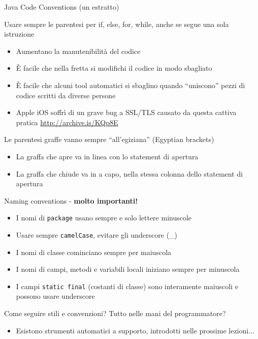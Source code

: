 \documentclass[xcolor=dvipsnames,presentation]{beamer}
\begin{document}
\begin{frame}[allowframebreaks]{Java Code Conventions (un estratto)}
	\begin{block}{Usare sempre le parentesi per if, else, for, while, anche se segue una sola istruzione}
		\begin{itemize}
			\item Aumentano la manutenibilità del codice
			\item È facile che nella fretta si modifichi il codice in modo sbagliato
			\item È facile che alcuni tool automatici si sbaglino quando ``uniscono'' pezzi di codice scritti da diverse persone
			\item Apple iOS soffrì di un grave bug a SSL/TLS causato da questa cattiva pratica \url{http://archive.is/KQp8E}
		\end{itemize}
	\end{block}
	\begin{block}{Le parentesi graffe vanno sempre ``all'egiziana'' (Egyptian brackets)}
		\begin{itemize}
			\item La graffa che apre va in linea con lo statement di apertura
			\item La graffa che chiude va in a capo, nella stessa colonna dello statement di apertura
		\end{itemize}
	\end{block}
	\begin{block}{Naming conventions - \textbf{molto importanti!}}
		\begin{itemize}
			\item I nomi di \texttt{package} usano sempre e solo lettere minuscole
			\item Usare sempre \texttt{camelCase}, evitare gli underscore (\_)
			\item I nomi di classe cominciano sempre per maiuscola
			\item I nomi di campi, metodi e variabili locali iniziano sempre per minuscola
			\item I campi \texttt{static final} (costanti di classe) sono interamente maiuscoli e possono usare underscore
		\end{itemize}
	\end{block}

Come seguire stili e convenzioni? Tutto nelle mani del programmatore?
\begin{itemize}
\item Esistono strumenti automatici a supporto, introdotti nelle prossime lezioni...
	\end{itemize}
\end{frame}
\end{document}
